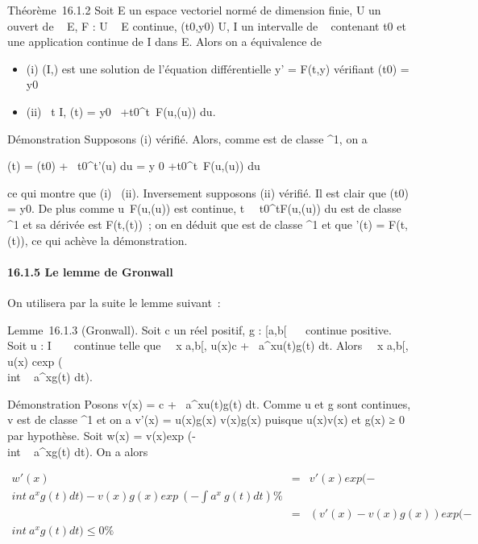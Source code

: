 Théorème~16.1.2 Soit E un espace vectoriel normé de dimension finie, U
un ouvert de ~ \times E, F : U \rightarrow~ E continue, (t0,y0) \in U,
I un intervalle de ~ contenant t0 et \phi une application
continue de I dans E. Alors on a équivalence de

\begin{itemize}
\itemsep1pt\parskip0pt
\item
  (i) (I,\phi) est une solution de l'équation différentielle y' = F(t,y)
  vérifiant \phi(t0) = y0
\item
  (ii) \forall~t \in I, \phi(t) = y0~
  +\int  t0^t~F(u,\phi(u))
  du.
\end{itemize}

Démonstration Supposons (i) vérifié. Alors, comme \phi est de classe
^1, on a

\phi(t) = \phi(t0) +\int ~
t0^t\phi'(u) du = y 0
+\int  t0^t~F(u,\phi(u))
du

ce qui montre que (i) \rigtharrow~(ii). Inversement supposons (ii) vérifié. Il est
clair que \phi(t0) = y0. De plus comme
u\mapsto~F(u,\phi(u)) est continue,
t\mapsto~\int ~
t0^tF(u,\phi(u)) du est de classe ^1
et sa dérivée est F(t,\phi(t))~; on en déduit que \phi est de classe
^1 et que \phi'(t) = F(t,\phi(t)), ce qui achève la démonstration.

\paragraph{16.1.5 Le lemme de Gronwall}

On utilisera par la suite le lemme suivant~:

Lemme~16.1.3 (Gronwall). Soit c un réel positif, g : {[}a,b{[}\rightarrow~ ~
continue positive. Soit u : I \rightarrow~ ~ continue telle que
\forall~~x \in {[}a,b{[}, \textbar{}u(x)\textbar{}\leq c
+\int ~
a^x\textbar{}u(t)\textbar{}g(t) dt. Alors
\forall~~x \in {[}a,b{[}, \textbar{}u(x)\textbar{}\leq
cexp (\\int ~
a^xg(t) dt).

Démonstration Posons v(x) = c +\int ~
a^x\textbar{}u(t)\textbar{}g(t) dt. Comme u et g sont
continues, v est de classe ^1 et on a v'(x) =
\textbar{}u(x)\textbar{}g(x) \leq v(x)g(x) puisque
\textbar{}u(x)\textbar{}\leq v(x) et g(x) ≥ 0 par hypothèse. Soit w(x) =
v(x)exp (-\\int ~
a^xg(t) dt). On a alors

\begin{align*} w'(x)& =&
v'(x)exp (-\\int ~
a^xg(t) dt) - v(x)g(x)exp~
(-\int  a^x~g(t) dt)\%&
\\ & =& (v'(x) -
v(x)g(x))exp (-\\int ~
a^xg(t) dt) \leq 0 \%& \\
\end{align*}

